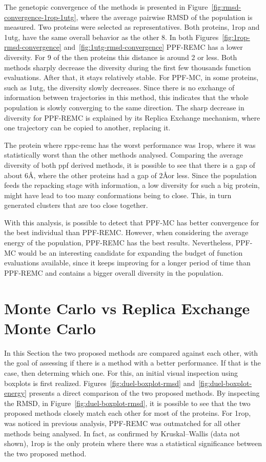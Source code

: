 The genetopic convergence of the methods is presented in
Figure~\ref{fig:rmsd-convergence-1rop-1utg}, where the average pairwise RMSD of
the population is measured. Two proteins were selected as representatives.
Both proteins, 1rop and 1utg, have the same overall behavior as the other 8.
In both Figures~\ref{fig:1rop-rmsd-convergence}
and~\ref{fig:1utg-rmsd-convergence} PPF-REMC has a lower diversity. For 9 of
the then proteins this distance is around 2 or less. Both methods sharply
decrease the diversity during the first few thousands function evaluations.
After that, it stays relatively stable. For PPF-MC, in some proteins, such as
1utg, the diversity slowly decreases. Since there is no exchange of information
between trajectories in this method, this indicates that the whole population
is slowly converging to the same direction. The sharp decrease in diversity for
PPF-REMC is explained by its Replica Exchange mechanism, where one trajectory
can be copied to another, replacing it.

The protein where rppc-remc has the worst performance was 1rop, where it was
statistically worst than the other methods analysed. Comparing the average
diversity of both ppf derived methods, it is possible to see that there is a
gap of about $6$\AA, where the other proteins had a gap of $2$\AA  or less.
Since the population feeds the repacking stage with information, a low diversity
for such a big protein, might have lead to too many conformations being to close.
This, in turn generated clusters that are too close together.

With this analysis, is possible to detect that PPF-MC has better
convergence for the best individual than PPF-REMC. However, when considering
the average energy of the population, PPF-REMC has the best results.
Nevertheless, PPF-MC would be an interesting candidate for expanding the
budget of function evaluations available, since it keeps improving for a
longer period of time than PPF-REMC and contains a bigger overall diversity in
the population.

\section{Monte Carlo vs Replica Exchange Monte Carlo}
\label{sec:methods-duel}

In this Section the two proposed methods are compared against each other, with
the goal of assessing if there is a method with a better performance. If that is
the case, then determing which one. For this, an initial visual inspection
using boxplots is first realized. Figures~\ref{fig:duel-boxplot-rmsd}
and~\ref{fig:duel-boxplot-energy} presents a direct comparison of the two
proposed methods. By inspecting the RMSD, in Figure~\ref{fig:duel-boxplot-rmsd},
it is possible to see that the two proposed methods closely match each other for
most of the proteins. For 1rop, was noticed in previous analysis, PPF-REMC was
outmatched for all other methods being analysed. In fact, as confirmed by
Kruskal–Wallis (data not shown), 1rop is the only protein where there was
a statistical significance between the two proposed method.

